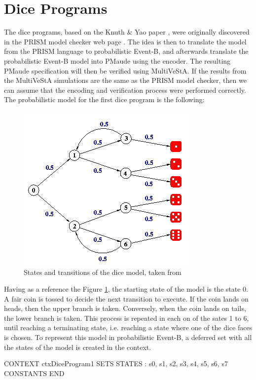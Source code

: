 \section{Dice Programs}
The dice programs, based on the Knuth \& Yao paper \cite{knuth}, were originally discovered in the PRISM model checker web page \cite{PRISMDICE}. The idea is then to translate the model from the PRISM language to probabilistic Event-B, and afterwards translate the probabilistic Event-B model into PMaude using the encoder. The resulting PMaude specification will then be verified using MultiVeStA. If the results from the MultiVeStA simulations are the same as the PRISM model checker, then we can assume that the encoding and verification process were performed correctly. The probabilistic model for the first dice program is the following:
\begin{figure}[H]
    \centering
    \includegraphics[scale = 0.5]{images/CS1.png}
    \caption{States and transitions of the dice model, taken from \cite{PRISMDICE}}
    \label{fig:ce1}
\end{figure}
Having as a reference the Figure \ref{fig:ce1}, the starting state of the model is the state 0. A fair coin is tossed to decide the next transition to execute. If the coin lands on heads, then the upper branch is taken. Conversely, when the coin lands on tails, the lower branch is taken. This process is repeated in each on of the sates 1 to 6, until reaching a terminating state, i.e. reaching a state where one of the dice faces is chosen. To represent this model in probabilistic Event-B, a deferred set with all the states of the model is created in the context.
\begin{maude}

CONTEXT ctxDiceProgram1
SETS 
    STATES : { s0, s1, s2, s3, s4, s5, s6, s7 }
CONSTANTS 
END
\end{maude}
